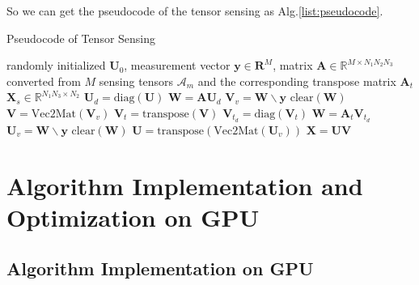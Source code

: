 \documentclass[journal,article,submit,moreauthors,pdftex,10pt,a4paper]{Definitions/mdpi}
\theoremstyle{plain}
\theoremstyle{definition}
\theoremstyle{remark}
\begin{document}
So we can get the pseudocode of the tensor sensing as Alg.\ref{list:pseudocode}.
\begin{algorithm}
\caption{Pseudocode of Tensor Sensing}
\label{list:pseudocode}
\begin{algorithmic}[1]
    \Require randomly initialized $\mathbf{U}_0$, measurement vector $\mathbf{y} \in \mathbf{R}^M$, matrix $\mathbf{A} \in \mathbb{R}^{M \times N_1N_2N_3}$ converted from $M$ sensing tensors $\mathcal{A}_m$ and the corresponding transpose matrix $\mathbf{A}_t$
    \Ensure $\mathbf{X}_s \in \mathbb{R}^{N_1N_3 \times N_2}$
        \State $\mathbf{U}_{d} = \text{diag}(\mathbf{U})$
        \State $\mathbf{W} = \mathbf{A} \mathbf{U}_{d}$
        \State $\mathbf{V}_{v} = \mathbf{W} \backslash \mathbf{y}$
        \State $\text{clear}(\mathbf{W})$
        \State $\mathbf{V} = \text{Vec2Mat}(\mathbf{V}_{v})$
        \State $\mathbf{V}_t = \text{transpose}(\mathbf{V})$
        \State $\mathbf{V}_{t_{d}} = \text{diag}(\mathbf{V}_t)$
        \State $\mathbf{W} = \mathbf{A}_t \mathbf{V}_{t_{d}}$
        \State $\mathbf{U}_{v} = \mathbf{W} \backslash \mathbf{y}$
        \State $\text{clear}(\mathbf{W})$
        \State $\mathbf{U} = \text{transpose}(\text{Vec2Mat}(\mathbf{U}_{v}))$
    \EndFor
    \State \Return $\mathbf{X} = \mathbf{U} \mathbf{V}$
    \end{algorithmic}
    \end{algorithm}

\section{Algorithm Implementation and Optimization on GPU}
\subsection{Algorithm Implementation on GPU}
\end{document}
